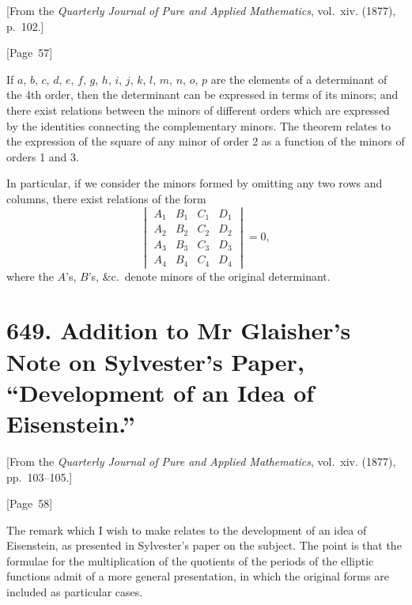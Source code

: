 \documentclass[11pt,a4paper]{book}
\begin{document}
[From the \textit{Quarterly Journal of Pure and Applied Mathematics},
vol.~xiv. (1877), p.~102.]

\begin{center}
[Page~57]
\end{center}

If $a$, $b$, $c$, $d$, $e$, $f$, $g$, $h$, $i$, $j$, $k$, $l$, $m$, $n$, $o$, $p$
are the elements of a determinant of the 4th order, then the determinant
can be expressed in terms of its minors; and there exist relations
between the minors of different orders which are expressed by the
identities connecting the complementary minors. The theorem relates
to the expression of the square of any minor of order 2 as a function
of the minors of orders 1 and 3.

In particular, if we consider the minors formed by omitting any two
rows and columns, there exist relations of the form
\[
\begin{vmatrix}
A_1 & B_1 & C_1 & D_1 \\
A_2 & B_2 & C_2 & D_2 \\
A_3 & B_3 & C_3 & D_3 \\
A_4 & B_4 & C_4 & D_4
\end{vmatrix} = 0,
\]
where the $A$'s, $B$'s, \&c.\ denote minors of the original determinant.


\newpage
\section*{649. Addition to Mr Glaisher's Note on Sylvester's Paper, ``Development of an Idea of Eisenstein.''}

[From the \textit{Quarterly Journal of Pure and Applied Mathematics},
vol.~xiv. (1877), pp.~103--105.]

\begin{center}
[Page~58]
\end{center}

The remark which I wish to make relates to the development of an idea
of Eisenstein, as presented in Sylvester's paper on the subject. The
point is that the formulae for the multiplication of the quotients of
the periods of the elliptic functions admit of a more general
presentation, in which the original forms are included as particular
cases.
\end{document}
